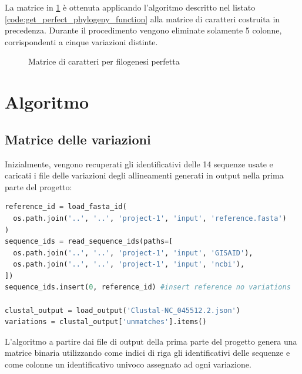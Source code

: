 \documentclass[11pt,italian]{article}
\begin{document}
La matrice in \cref{fig:matrix-perfect-phylo} è ottenuta applicando l'algoritmo descritto nel listato \ref{code:get_perfect_phylogeny_function} alla matrice di caratteri costruita in precedenza. Durante il procedimento vengono eliminate solamente 5 colonne, corrispondenti a cinque variazioni distinte.
\begin{figure}[H]
  \caption{Matrice di caratteri per filogenesi perfetta}
  \label{fig:matrix-perfect-phylo}
\end{figure}

\newpage
\section{Algoritmo}
\subsection{Matrice delle variazioni}
Inizialmente, vengono recuperati gli identificativi delle 14 sequenze usate e caricati i file delle variazioni degli allineamenti generati in output nella prima parte del progetto:

\begin{lstlisting}[language=Python,caption=Caricamento dei file necessari per l'elaborazione,label=code:read_input_files]
reference_id = load_fasta_id(
  os.path.join('..', '..', 'project-1', 'input', 'reference.fasta')
)
sequence_ids = read_sequence_ids(paths=[
  os.path.join('..', '..', 'project-1', 'input', 'GISAID'),
  os.path.join('..', '..', 'project-1', 'input', 'ncbi'),
])
sequence_ids.insert(0, reference_id) #insert reference no variations

clustal_output = load_output('Clustal-NC_045512.2.json')
variations = clustal_output['unmatches'].items()
\end{lstlisting}

\noindent
L'algoritmo a partire dai file di output della prima parte del progetto genera una matrice binaria utilizzando come indici di riga gli identificativi delle sequenze e come colonne un identificativo univoco assegnato ad ogni variazione.
\end{document}
